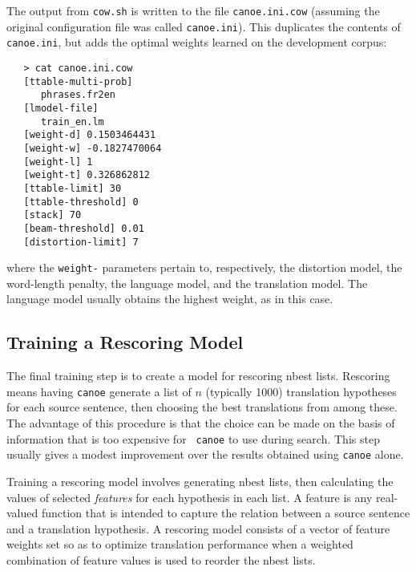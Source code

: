 \documentclass[11pt]{article}
\begin{document}
The output from {\tt cow.sh} is written to the file {\tt canoe.ini.cow}
(assuming the original configuration file was called {\tt canoe.ini}). This
duplicates the contents of {\tt canoe.ini}, but adds the optimal weights
learned on the development corpus:
\begin{verbatim}
   > cat canoe.ini.cow
   [ttable-multi-prob] 
      phrases.fr2en
   [lmodel-file] 
      train_en.lm
   [weight-d] 0.1503464431
   [weight-w] -0.1827470064
   [weight-l] 1
   [weight-t] 0.326862812
   [ttable-limit] 30
   [ttable-threshold] 0
   [stack] 70
   [beam-threshold] 0.01
   [distortion-limit] 7
\end{verbatim}
where the {\tt weight-} parameters pertain to, respectively, the distortion
model, the word-length penalty, the language model, and the translation
model. The language model usually obtains the highest weight, as in this case. 

\subsection{Training a Rescoring Model} \label{RAT}

The final training step is to create a model for rescoring nbest
lists. Rescoring means having {\tt canoe} generate a list of $n$ (typically
1000) translation hypotheses for each source sentence, then choosing the best
translations from among these. The advantage of this procedure is that the
choice can be made on the basis of information that is too expensive for {\tt
canoe} to use during search. This step usually gives a modest improvement over
the results obtained using {\tt canoe} alone.

Training a rescoring model involves generating nbest lists, then calculating
the values of selected {\em features} for each hypothesis in each list. A
feature is any real-valued function that is intended to capture the relation
between a source sentence and a translation hypothesis. A rescoring model
consists of a vector of feature weights set so as to optimize translation
performance when a weighted combination of feature values is used to reorder
the nbest lists.
\end{document}
